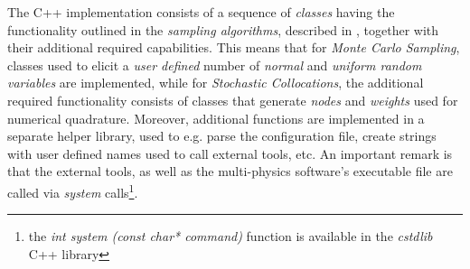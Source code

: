 	The C++ implementation consists of a sequence of \emph{classes} having the functionality outlined in the \emph{sampling algorithms}, described in , together with their additional required capabilities. This means that for \emph{Monte Carlo Sampling}, classes used to elicit a \emph{user defined} number of \emph{normal}  and \emph{uniform random variables} are implemented, while for \emph{Stochastic Collocations}, the additional required functionality consists of classes that generate \emph{nodes} and \emph{weights} used for numerical quadrature. Moreover, additional functions are implemented in a separate helper library, used to e.g. parse the configuration file, create strings with user defined names used to call external tools, etc. An important remark is that the external tools, as well as the multi-physics software's executable file are called via \emph{system} calls\footnote{the \emph{int system (const char* command)} function is available in the \emph{cstdlib} C++ library}. 
		
